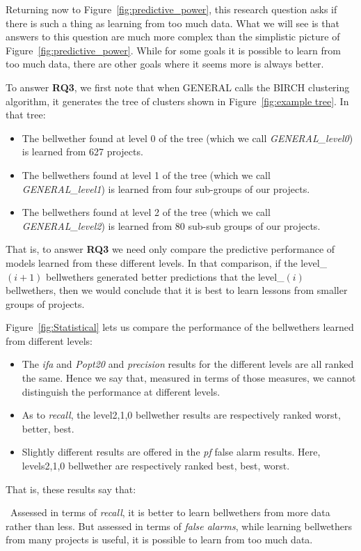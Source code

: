 \documentclass[10pt,journal,compsoc]{IEEEtran}
\newcommand{\fig}[1]{Figure~\ref{fig:#1}}
\newcommand{\bi}{\begin{itemize}}
\newcommand{\ei}{\end{itemize}}
\newenvironment{RQ}[1]%
{\noindent\begin{minipage}[c]{\linewidth}%
\begin{bclogo}[couleur=gray!20,%
                arrondi=0.1,logo=\bctrombone,%
                ombre=true%
                ]{{\small  ~#1}}}%
{\end{bclogo}\vspace{2mm}\end{minipage}}
\begin{document}
Returning now to \fig{predictive_power}, this
research question asks if there is such a thing
as learning from too much data.  What we will see is that
answers to this question are much more complex than the simplistic
picture of \fig{predictive_power}. While for some goals it is possible
to learn from too much data, there are other goals where it seems
more is always better.

To answer {\bf RQ3}, we first note that when GENERAL
calls the BIRCH clustering algorithm, it generates the tree
of clusters shown in  
\fig{example tree}. In that tree:
\bi
\item
The bellwether found at level 0 of the tree
(which we call {\em GENERAL\_level0}) is learned from 627 projects.
\item
The bellwethers found at level 1 of the tree
(which we call {\em GENERAL\_level1}) is learned from four sub-groups
of our projects.
\item
The bellwethers found at level 2 of the tree
(which we call {\em GENERAL\_level2}) is learned from 80
sub-sub groups of our projects.
\ei
That is, to answer {\bf RQ3} we need only compare the predictive performance
of models learned from these different levels. In that comparison,
if the level\_$(i+1)$ bellwethers generated better predictions
that the   level\_$(i)$ bellwethers, then we would conclude that it is best to learn lessons from smaller groups
of projects.

Figure~\ref{fig:Statistical} lets us
compare the performance of the bellwethers learned from different 
levels:
\bi
\item The {\em ifa} and {\em Popt20} 
and {\em precision}  results for the different levels
are all ranked the same.  Hence we say that, measured in terms of those 
measures, we cannot distinguish the performance at different levels.
\item 
As to {\em recall},   the level2,1,0 bellwether results are 
respectively ranked worst, better, best. 
\item
Slightly different results are offered in the {\em pf} false alarm results. Here,  levels2,1,0 bellwether are respectively ranked best, best, worst.
\ei
That is, these results say that:

\begin{RQ}
{Assessed in terms of {\em recall},
it is better to learn bellwethers from more data rather than less.
But assessed in terms of {\em false alarms}, 
while learning bellwethers
from many projects is useful, it is possible to learn from too much data.} 
\end{RQ}
\end{document}
